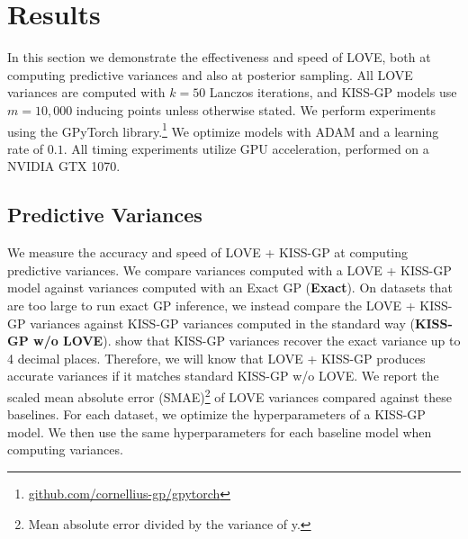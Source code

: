 \section{Results}
\label{sec:love_results}

In this section we demonstrate the effectiveness and speed of LOVE{}, both at computing predictive variances and also at posterior sampling.
All LOVE{} variances are computed with $k=50$ Lanczos iterations,
and KISS-GP models use $m\!=\!10,\!000$ inducing points unless otherwise stated.
We perform experiments using the GPyTorch library.\footnote{
  \url{github.com/cornellius-gp/gpytorch}}
We optimize models with ADAM \cite{kingma2014adam} and a learning rate of $0.1$.
All timing experiments utilize GPU acceleration, performed on a NVIDIA GTX 1070.

\subsection{Predictive Variances}
\label{sec:results_variances}

We measure the accuracy and speed of LOVE + KISS-GP{} at computing predictive variances.
We compare variances computed with a LOVE + KISS-GP{} model against variances computed with an Exact GP ({\bf Exact}).
On datasets that are too large to run exact GP inference, we instead compare the LOVE + KISS-GP{} variances against KISS-GP variances computed in the standard way ({\bf KISS-GP w/o LOVE{}}).
\citet{wilson2015thoughts} show that KISS-GP variances recover the exact variance up to 4 decimal places.
Therefore, we will know that LOVE + KISS-GP{} produces accurate variances if it matches standard KISS-GP w/o LOVE{}.
We report the scaled mean absolute error (SMAE)\footnote{
  Mean absolute error divided by the variance of y.
} \cite{rasmussen2006gaussian} of LOVE{} variances compared against these baselines.
For each dataset, we optimize the hyperparameters of a KISS-GP model.
We then use the same hyperparameters for each baseline model when computing variances.

